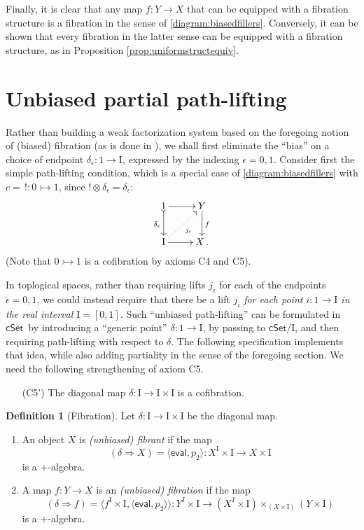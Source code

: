 \documentclass[11pt]{article}
\newcommand{\cSet}{\ensuremath{\mathsf{cSet}}}
\newcommand{\mono}{\ensuremath{\rightarrowtail}}
\newcommand{\I}{\ensuremath{\mathrm{I}}}
\theoremstyle{remark}
\theoremstyle{definition}
\newtheorem{definition}[theorem]{Definition}
\begin{document}
Finally, it is clear that any map $f: Y\to X$  that can be equipped with a fibration structure is a fibration in the sense of \eqref{diagram:biasedfillers}.  Conversely, it can be shown that every fibration in the latter sense can be equipped with a fibration structure, as in Proposition \ref{prop:uniformstructequiv}.

\section{Unbiased partial path-lifting}


Rather than building a weak factorization system based on the foregoing notion of (biased) fibration (as is done in \cite{GG,OP}), we shall first eliminate the ``bias'' on a choice of endpoint $\delta_\epsilon : 1 \to \I$, expressed by the indexing $\epsilon = 0,1$.  Consider first the simple path-lifting condition, which is a special case of \eqref{diagram:biasedfillers} with $c =\, ! : 0\mono 1$, since $!\otimes\delta_\epsilon = \delta_\epsilon$:
\begin{equation*}
\xymatrix{
1 \ar@{>->}[d]_{\delta_\epsilon} \ar[r] & Y \ar[d]^f \\
\I \ar@{.>}[ru]_{j_\epsilon} \ar[r] & X\,.
}
\end{equation*}
(Note that $0\mono 1$ is a cofibration by axioms C4 and C5).

In toplogical spaces, rather than requiring lifts $j_\epsilon$ for each of the endpoints $\epsilon = 0,1$, we could instead require that there be a lift $j_i$ \emph{for each point $i: 1\to\I$ in the real interval $\I = [0,1]$}. Such ``unbiased path-lifting'' can be formulated in \cSet\ by introducing a ``generic point'' $\delta : 1\to \I$, by passing to $\cSet/\I$, and then requiring path-lifting with respect to $\delta$.  The following specification implements that  idea, while also adding partiality in the sense of the foregoing section.  We need the following strengthening of axiom C5.

\begin{enumerate}
\item[(C5')] The diagonal map $\delta : \I\to\I\times\I$ is a cofibration.  
\end{enumerate}

\begin{definition}[Fibration] Let $\delta : \I\to\I\times\I$ be the diagonal map.
\begin{enumerate}
\item An object $X$ is \emph{(unbiased) fibrant} if the map 
\[
(\delta\Rightarrow\! X) = \langle\mathsf{eval}, p_2\rangle : X^\I \times \I \to X\times \I
\]
is a $+$-algebra. 
\item A map $f : Y\to X$ is an \emph{(unbiased) fibration} if the map 
\[
(\delta\Rightarrow\! f) = \langle f^\I\times \I, \langle \mathsf{eval},p_2 \rangle\rangle: Y^I\times \I \to (X^I \times \I)\times_{(X\times \I)} (Y\times\I)
\]
is a $+$-algebra.
\end{enumerate}
\end{definition}
\end{document}
